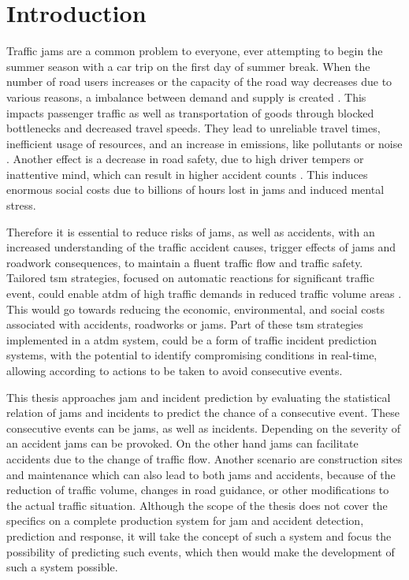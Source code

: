 \chapter{Introduction}
\setcounter{page}{1}
Traffic \glspl{jam} are a common problem to everyone, ever attempting to begin the summer season with a car trip on the first day of summer break. When the number of road users increases or the capacity of the road way decreases due to various reasons, a imbalance between demand and supply is created \parencite{Tang2019}. This impacts passenger traffic as well as transportation of goods through blocked bottlenecks and decreased travel speeds. They lead to unreliable travel times, inefficient usage of resources, and an increase in emissions, like pollutants or noise \parencite{FHA2011}. Another effect is a decrease in road safety, due to high driver tempers or inattentive mind, which can result in higher accident counts \parencite{Sun2016}. This induces enormous social costs due to billions of hours lost in \glspl{jam} and induced mental stress. \parencite{RetallackOstendorf2019,BardtFritsch2014,ADAC2019}

Therefore it is essential to reduce risks of \glspl{jam}, as well as accidents, with an increased understanding of the traffic accident causes, trigger effects of \glspl{jam} and roadwork consequences, to maintain a fluent traffic flow and traffic safety. Tailored \acrfull{tsm} strategies, focused on automatic reactions for significant traffic event, could enable \acrfull{atdm} of high traffic demands in reduced traffic volume areas \parencite{Tang2019}. This would go towards reducing the economic, environmental, and social costs associated with accidents, roadworks or \glspl{jam}. Part of these \acrshort{tsm} strategies implemented in a \acrshort{atdm} system, could be a form of traffic incident prediction systems, with the potential to identify compromising conditions in real-time, allowing according to actions to be taken to avoid consecutive events. \parencite{RetallackOstendorf2019} 

\bigskip

This thesis approaches \gls{jam} and incident prediction by evaluating the statistical relation of \glspl{jam} and incidents to predict the chance of a consecutive event. These consecutive events can be \glspl{jam}, as well as incidents. Depending on the severity of an accident \glspl{jam} can be provoked. On the other hand \glspl{jam} can facilitate accidents due to the change of traffic flow. Another scenario are construction sites and maintenance which can also lead to both \glspl{jam} and accidents, because of the reduction of traffic volume, changes in road guidance, or other modifications to the actual traffic situation. Although the scope of the thesis does not cover the specifics on a complete production system for \gls{jam} and accident detection, prediction and response, it will take the concept of such a system and focus the possibility of predicting such events, which then would make the development of such a system possible. 

